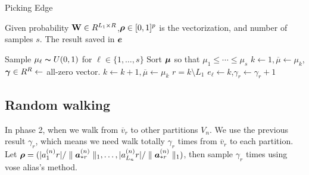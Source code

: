 \documentclass{article}
\newcommand{\V}[1]{{\bm{{\MakeLowercase{#1}}}}}%
\newcommand{\Vacol}[1]{\V{a}^{(#1)}_{*r}}
\newcommand{\M}[1]{{\bm{\mathbf{\MakeUppercase{#1}}}}}%
\newcommand{\norm}[2]{\parallel#1\parallel_{#2}}
\begin{document}
\begin{algorithm}[ht]
    \caption{Picking Edge}
    \label{alg:Pickedge}
    Given probability $\M{W}\in R^{L_1\times R}$,$\V{\rho}\in[0,1]^p$ is the vectorization, and number of samples $s$.
    The result saved in $\V{e}$
    \begin{algorithmic}[1]
    \State Sample $\mu_{\ell} \thicksim U(0,1)$ for $\ell \in \{1,\ldots,s\}$
    \State Sort $\V{\mu}$ so that $\mu_1 \leq \cdots\leq\mu_s$
    \State $k \leftarrow 1,\overline{\mu} \leftarrow \mu_k$,$\V{\gamma}\in R^R\leftarrow$ all-zero vector.
    \While {$\mu_{\ell} > \overline{\mu}$}
    \State $k \leftarrow k+1,\overline{\mu} \leftarrow \mu_k$
    \EndWhile
    \State $r = k \setminus L_1$
    \State $e_{\ell}\leftarrow k$,$\gamma_{r}\leftarrow \gamma_{r} + 1$
    \EndFor
    \end{algorithmic}
\end{algorithm}
\subsection{Random walking}

In phase 2, when we walk from $\overline{v}_r$ to other partitions $V_n$. We use the previous result $\gamma_{r}$, which means we need walk totally $\gamma_{r}$ times from $\overline{v}_r$ to each  partition. Let $\V{\rho} = (|{a}^{(n)}_{1}{r}|/\norm{\Vacol{n}}{1},\ldots,|{a}^{(n)}_{L_n}{r}|/\norm{\Vacol{n}}{1})$, then sample $\gamma_{r}$ times using vose alias's method.
\end{document}
